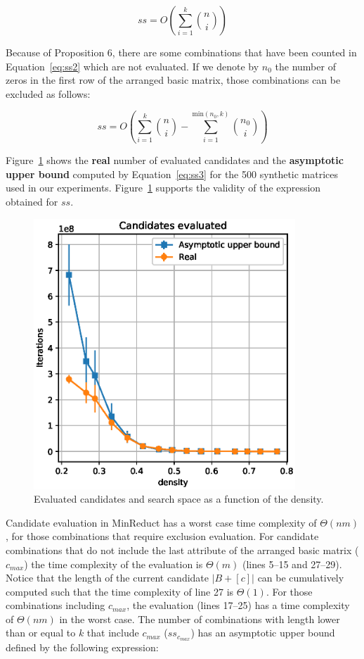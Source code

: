 \documentclass[citenumber]{llncs}
\begin{document}
	\begin{equation}
	ss= O\left( \sum_{i=1}^{k} \binom{n}{i}\right)\label{eq:ss2}
	\end{equation}
	
	Because of Proposition 6, there are some combinations that have been counted in Equation~\ref{eq:ss2} which are not evaluated. If we denote by $n_0$ the number of zeros in the first row of the arranged basic matrix, those combinations can be excluded as follows:	
	
	\begin{equation}
	ss= O\left(\sum_{i=1}^{k} \binom{n}{i} - \sum_{i=1}^{\mathrm{min}(n_0,k)} \binom{n_0}{i}\right)\label{eq:ss3}
	\end{equation}
			
	Figure~\ref{fig:candidates} shows the \textbf{real} number of evaluated candidates and the \textbf{asymptotic upper bound} computed by Equation~\ref{eq:ss3} for the 500 synthetic matrices used in our experiments. Figure~\ref{fig:candidates} supports the validity of the expression obtained for $ss$.
	
	\begin{figure}[hbt] 
		\begin{center}
			\includegraphics[height=4in]{Candidates_vs_SearchSpace.eps}
		\end{center}
		\caption{Evaluated candidates and search space as a function of the density.}\label{fig:candidates}
	\end{figure}  
	
	Candidate evaluation in MinReduct has a worst case time complexity of $\Theta(nm)$, for those combinations that require exclusion evaluation. For candidate combinations that do not include the last attribute of the arranged basic matrix ($c_{max}$) the time complexity of the evaluation is $\Theta(m)$ (lines 5--15 and 27--29). Notice that the length of the current candidate $|B+ [c]|$ can be cumulatively computed such that the time complexity of line 27 is $\Theta(1)$. For those combinations including $c_{max}$, the evaluation (lines 17--25) has a time complexity of $\Theta(nm)$ in the worst case. The number of combinations with length lower than or equal to $k$ that include $c_{max}$ ($ss_{c_{max}}$) has an asymptotic upper bound defined by the following expression:
	
\end{document}
